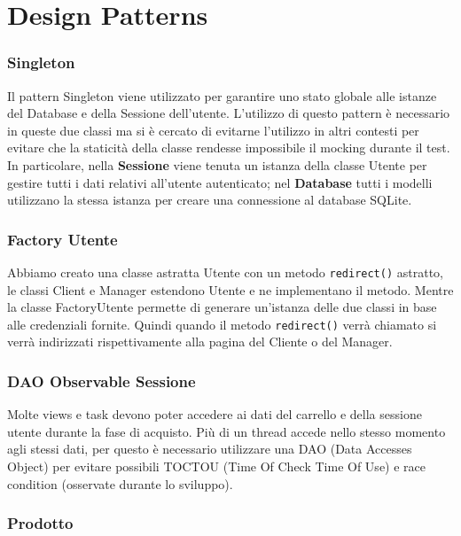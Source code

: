 \documentclass[12pt, a4paper]{report}
\begin{document}
\newpage

\section{Design Patterns}

\subsubsection{Singleton}	

Il pattern Singleton viene utilizzato per garantire uno stato globale alle
istanze del Database e della Sessione dell'utente. L'utilizzo di questo pattern
è necessario in queste due classi ma si è cercato di evitarne l'utilizzo in
altri contesti per evitare che la staticità della classe rendesse impossibile
il mocking durante il test. In particolare, nella \textbf{Sessione} viene
tenuta un istanza della classe Utente per gestire tutti i dati relativi
all'utente autenticato; nel \textbf{Database} tutti i modelli utilizzano la
stessa istanza per creare una connessione al database SQLite. 

\subsubsection{Factory Utente}

Abbiamo creato una classe astratta Utente con un metodo \verb|redirect()|
astratto, le classi Client e Manager estendono Utente e ne implementano il
metodo. Mentre la classe FactoryUtente permette di generare un'istanza delle
due classi in base alle credenziali fornite. Quindi quando il metodo
\verb|redirect()| verrà chiamato si verrà indirizzati rispettivamente alla
pagina del Cliente o del Manager.

\subsubsection{DAO Observable Sessione}

Molte views e task devono poter accedere ai dati del carrello e della sessione
utente durante la fase di acquisto. Più di un thread accede nello stesso
momento agli stessi dati, per questo è necessario utilizzare una DAO (Data
Accesses Object) per evitare possibili TOCTOU (Time Of Check Time Of Use) e
race condition (osservate durante lo sviluppo).

\subsubsection{Prodotto}
\end{document}
